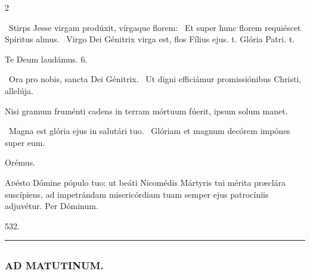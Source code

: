 \documentclass[9pt,twoside]{extarticle}
\begin{document}
\begin{multicols}{2}
\begin{tightlist}{}
\item {}~Stirps Jesse virgam prodúxit, vírgaque florem: \textred{*}~Et super hunc florem requiéscet Spíritus almus. ~Virgo Dei Génitrix virga est, flos Fílius ejus. t. Glória Patri. t.
\item Te Deum laudámus. 6. 
\item {}~Ora pro nobis, sancta Dei Génitrix. ~Ut digni efficiámur promissiónibus Christi, allelúja.
\item {} Nisi gramum fruménti cadens in terram mórtuum fúerit, ipsum solum manet.
\item {}~Magna est glória ejus in salutári tuo. ~Glóriam et magnum decórem impónes super eum.
\item Orémus. \hfill {}
\end{tightlist}
\lettrine{A}désto Dómine pópulo tuo: ut beáti Nicomédis Mártyris tui mérita præclára suscípiens, ad impetrándam misericórdiam tuam semper ejus patrocíniis adjuvétur. Per Dóminum.

\begin{tightlist}{}
\item {} 532.
\end{tightlist}

\begin{center}\textcolor{red}{\rule{\linewidth}{0.5pt}} \end{center}

\subsubsection*{\center \textsc{}}
\subsection*{\center \textsc{}}
\subsubsection*{\center \textsc{AD MATUTINUM.}}


\end{multicols}
\end{document}
